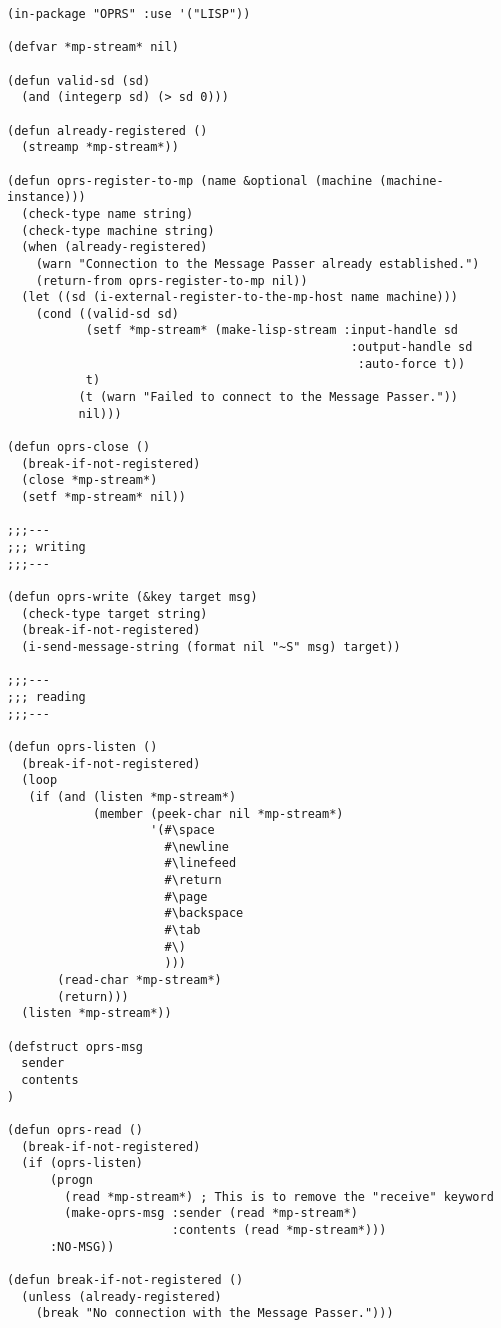 \begin{verbatim}
(in-package "OPRS" :use '("LISP"))

(defvar *mp-stream* nil)

(defun valid-sd (sd)
  (and (integerp sd) (> sd 0)))

(defun already-registered ()
  (streamp *mp-stream*))

(defun oprs-register-to-mp (name &optional (machine (machine-instance)))
  (check-type name string)
  (check-type machine string)
  (when (already-registered)
    (warn "Connection to the Message Passer already established.")
    (return-from oprs-register-to-mp nil))
  (let ((sd (i-external-register-to-the-mp-host name machine)))
    (cond ((valid-sd sd)
           (setf *mp-stream* (make-lisp-stream :input-handle sd
                                                :output-handle sd
                                                 :auto-force t))
           t)
          (t (warn "Failed to connect to the Message Passer."))
          nil)))

(defun oprs-close ()
  (break-if-not-registered)
  (close *mp-stream*)
  (setf *mp-stream* nil))

;;;---
;;; writing
;;;---

(defun oprs-write (&key target msg)
  (check-type target string)
  (break-if-not-registered)
  (i-send-message-string (format nil "~S" msg) target))

;;;---
;;; reading
;;;---

(defun oprs-listen ()
  (break-if-not-registered)
  (loop
   (if (and (listen *mp-stream*)
            (member (peek-char nil *mp-stream*)
                    '(#\space
                      #\newline
                      #\linefeed
                      #\return
                      #\page
                      #\backspace
                      #\tab
                      #\)
                      )))
       (read-char *mp-stream*)
       (return)))
  (listen *mp-stream*))

(defstruct oprs-msg
  sender
  contents
)

(defun oprs-read ()
  (break-if-not-registered)
  (if (oprs-listen)
      (progn
        (read *mp-stream*) ; This is to remove the "receive" keyword
        (make-oprs-msg :sender (read *mp-stream*)
                       :contents (read *mp-stream*)))
      :NO-MSG))

(defun break-if-not-registered ()
  (unless (already-registered)
    (break "No connection with the Message Passer.")))

\end{verbatim}

